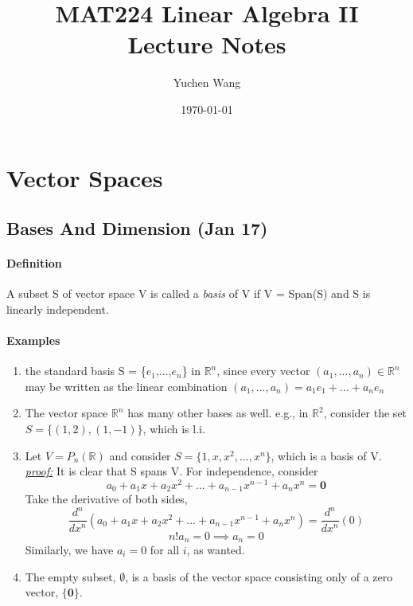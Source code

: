 \documentclass[11pt]{article}
\title{MAT224 Linear Algebra II \\ Lecture Notes}
\author{Yuchen Wang}
\date{\today}
\newcommand{\ti}[1]{\textit{#1}}
\newcommand{\tb}[1]{\textbf{#1}}
\newcommand{\mb}[1]{\mathbb{#1}}
\newcommand{\proof}[0]{\textit{\underline{proof:} }}
\begin{document}
	\maketitle
	\tableofcontents
	\newpage
	\section{Vector Spaces}
	\subsection{Bases And Dimension (Jan 17)}
	\paragraph{Definition} A subset S of vector space V is called a \ti{basis} of V if V = Span(S) and S is linearly independent.
	\paragraph{Examples} 
	\begin{enumerate}
		\item the standard basis S = \{\tb{$e_1$},...,\tb{$e_n$}\} in $\mb{R}^n$, since every vector $(a_1, ..., a_n) \in \mb{R}^n$ may be written as the linear combination $(a_1,..., a_n) = a_1e_1+ ... + a_ne_n$
		\item The vector space $\mb{R}^n$ has many other bases as well. e.g., in $\mb{R}^2$, consider the set $S = \{(1,2),(1,-1)\}$, which is l.i.
		\item Let $V = P_n(\mb{R})$ and consider $ S = \{1, x, x^2, ..., x^n\}$, which is a basis of V.
		\newline
		\proof It is clear that S spans V. For independence, consider
		$$a_0 + a_1x+a_2x^2+...+a_{n-1}x^{n-1}+a_nx^n = \tb{0}$$
		Take the derivative of both sides,
		$$\frac{d^n}{dx^n}(a_0 + a_1x+a_2x^2+...+a_{n-1}x^{n-1}+a_nx^n) = \frac{d^n}{dx^n}(0)$$
		$$n!a_n = 0 \implies a_n = 0$$
		Similarly, we have $a_i = 0$ for all $i$, as wanted.
		
		\item The empty subset, $\emptyset$, is a basis of the vector space consisting only of a zero vector, $\{\tb{0}\}$.
	\end{enumerate}
\end{document}
